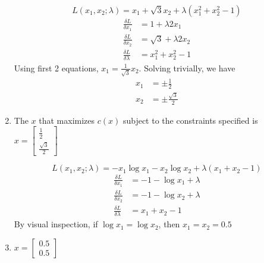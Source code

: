\documentclass[11pt]{scrartcl}
\begin{document}
\begin{enumerate}
\[L(x_1, x_2; \lambda) = x_1 + \sqrt{3}x_2 + \lambda(x_1^2 + x_2^2 - 1)\]
\begin{align*}
\frac{\delta L}{\delta x_1} &= 1 + \lambda 2x_1 \\
\frac{\delta L}{\delta x_2} &= \sqrt{3} + \lambda 2x_2 \\
\frac{\delta L}{\delta \lambda} &= x_1^2 + x_2^2 - 1
\end{align*}
Using first 2 equations, $x_1 = \frac{1}{\sqrt{3}}x_2$. Solving trivially, we have
\begin{align*}
x_1 &= \pm \frac{1}{2}\\
x_2 &= \pm \frac{\sqrt{3}}{2}
\end{align*}
\item The $x$ that maximizes $c(x)$ subject to the constraints specified is $x = \begin{bmatrix} \frac{1}{2} \\ \frac{\sqrt{3}}{2} \end{bmatrix}$

\[L(x_1, x_2; \lambda) = -x_1 \log{x_1} - x_2 \log{x_2} + \lambda (x_1 + x_2 - 1)\]
\begin{align*}
\frac{\delta L}{\delta x_1} &= -1 - \log{x_1} + \lambda\\
\frac{\delta L}{\delta x_2} &= -1 - \log{x_2} + \lambda \\
\frac{\delta L}{\delta \lambda} &= x_1 + x_2 - 1 
\end{align*}
By visual inspection, if $\log x_1 = \log x_2$, then $x_1 = x_2 = 0.5$
\item $x = \begin{bmatrix} 0.5 \\ 0.5 \end{bmatrix}$

\end{enumerate}
\end{document}
